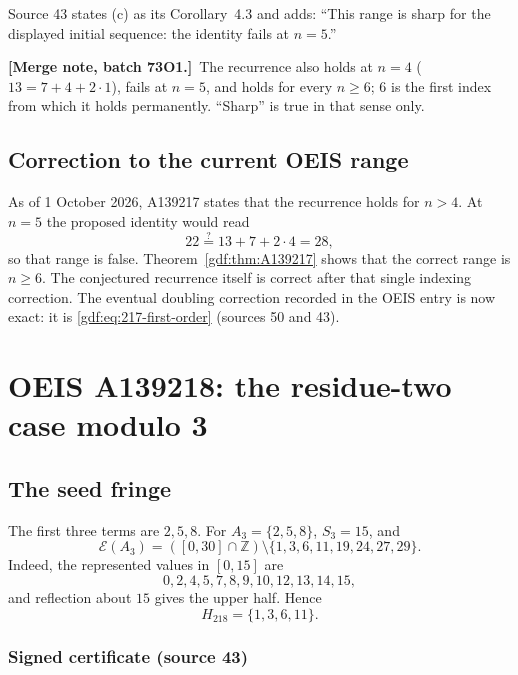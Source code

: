 \documentclass[11pt,a4paper]{article}
\numberwithin{equation}{section}
\theoremstyle{definition}
\theoremstyle{remark}
\theoremstyle{plain}
\newcommand{\Z}{\mathbb Z}
\newcommand{\cE}{\mathcal E}
\newcommand{\mergenote}[1]{\par\smallskip\noindent\textbf{[Merge note, batch 73O1.]}\ #1\par\smallskip}
\newcommand{\src}[1]{\textup{(source #1)}}
\begin{document}
Source 43 states (c) as its Corollary~4.3 and adds: ``This range is sharp for
the displayed initial sequence: the identity fails at $n=5$.''
\mergenote{The recurrence also holds at $n=4$ ($13=7+4+2\cdot1$), fails at
$n=5$, and holds for every $n\ge6$; $6$ is the first index from which it
holds permanently.  ``Sharp'' is true in that sense only.}

\subsection{Correction to the current OEIS range}

As of 1 October 2026, A139217 states that the recurrence holds for $n>4$.
At $n=5$ the proposed identity would read
\[
 22\stackrel{?}{=}13+7+2\cdot4=28,
\]
so that range is false.  Theorem~\ref{gdf:thm:A139217} shows that the correct
range is $n\ge6$.  The conjectured recurrence itself is correct after that
single indexing correction.  The eventual doubling correction recorded in the
OEIS entry is now exact: it is \eqref{gdf:eq:217-first-order}
(sources 50 and 43).

\section{OEIS A139218: the residue-two case modulo 3}\label{gdf:sec:A139218}

\subsection{The seed fringe}

The first three terms are $2,5,8$.  For $A_3=\{2,5,8\}$, $S_3=15$, and
\begin{equation}\label{gdf:eq:218-seed-E}
 \cE(A_3)=([0,30]\cap\Z)\setminus
 \{1,3,6,11,19,24,27,29\}.
\end{equation}
Indeed, the represented values in $[0,15]$ are
\[
 0,2,4,5,7,8,9,10,12,13,14,15,
\]
and reflection about $15$ gives the upper half.  Hence
\begin{equation}\label{gdf:eq:H218}
 H_{218}=\{1,3,6,11\}.
\end{equation}

\subsubsection*{Signed certificate \src{43}}
\end{document}
